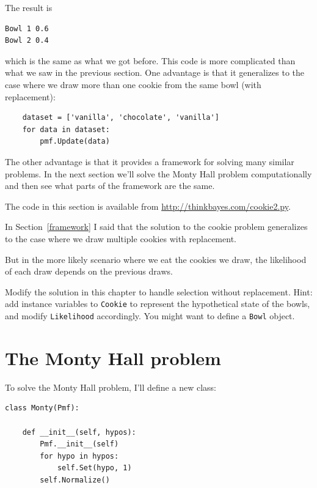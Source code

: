 \documentclass[12pt]{book}
\begin{document}
The result is

\begin{verbatim}
Bowl 1 0.6
Bowl 2 0.4
\end{verbatim}

which is the same as what we got before.  This code is more complicated
than what we saw in the previous section.  One advantage is that it
generalizes to the case where we draw more than one cookie from the
same bowl (with replacement):

\begin{verbatim}
    dataset = ['vanilla', 'chocolate', 'vanilla']
    for data in dataset:
        pmf.Update(data)
\end{verbatim}

The other advantage is that it provides a framework for solving many
similar problems.  In the next section we'll solve the Monty Hall
problem computationally and then see what parts of the framework are
the same.

The code in this section is available from
\url{http://thinkbayes.com/cookie2.py}.

\begin{exercise}

In Section~\ref{framework} I said that the solution to the cookie
problem generalizes to the case where we draw multiple cookies
with replacement.

But in the more likely scenario where we eat the cookies we draw,
the likelihood of each draw depends on the previous draws.

Modify the solution in this chapter to handle selection without
replacement.  Hint: add instance variables to {\tt Cookie} to
represent the hypothetical state of the bowls, and modify
{\tt Likelihood} accordingly.  You might want to define a 
{\tt Bowl} object.

\end{exercise}


\section{The Monty Hall problem}

To solve the Monty Hall problem, I'll define a new class:

\begin{verbatim}
class Monty(Pmf):

    def __init__(self, hypos):
        Pmf.__init__(self)
        for hypo in hypos:
            self.Set(hypo, 1)
        self.Normalize()
\end{verbatim}
\end{document}

